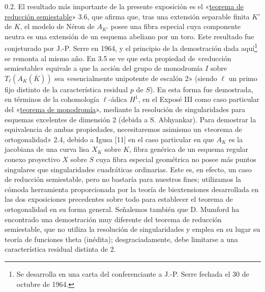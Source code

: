 0.2. El resultado más importante de la presente exposición es el
«\underline{teorema de reducción semiestable}» 3.6, que afirma que,
tras una extensión separable finita $K'$ de $K$, el modelo de Néron de
$A_{K'}$ posee una fibra especial cuya componente neutra es una
extensión de un esquema abeliano por un toro. Este resultado fue
conjeturado por J.-P. Serre en 1964, y el principio de la demostración
dada aquí\footnote{Se desarrolla en una carta del conferenciante a
J.-P. Serre fechada el 30 de octubre de 1964.} se remonta al mismo año.
En 3.5 se ve que esta propiedad de «reducción semiestable» equivale a
que la acción del grupo de monodromía $I$ sobre
$T_\ell(A_K(\overline K))$ sea «esencialmente unipotente de escalón 2»
(siendo $\ell$ un primo fijo distinto de la característica residual
$p$ de $S$). En esta forma fue demostrada, en términos de la cohomología
$\ell$-ádica $H^1$, en el Exposé III como caso particular del
«\underline{teorema de monodromía}», mediante la resolución de
singularidades para esquemas excelentes de dimensión $2$ (debida a
S. Abhyankar). Para demostrar la equivalencia de ambas propiedades,
necesitaremos asimismo un «teorema de ortogonalidad» 2.4, debido a
Igusa [11] en el caso particular en que $A_K$ es la jacobiana de una
curva lisa $X_K$ sobre $K$, fibra genérica de un esquema regular conexo
proyectivo $X$ sobre $S$ cuya fibra especial geométrica no posee más
puntos singulares que singularidades cuadráticas ordinarias. Este es,
en efecto, un caso de reducción semiestable, pero no bastaría para
nuestros fines; utilizamos la cómoda herramienta proporcionada por la
teoría de biextensiones desarrollada en las dos exposiciones
precedentes sobre todo para establecer el teorema de ortogonalidad en
su forma general. Señalemos también que D. Mumford ha encontrado una
demostración muy diferente del teorema de reducción semiestable, que
no utiliza la resolución de singularidades y emplea en su lugar su
teoría de funciones theta (inédita); desgraciadamente, debe limitarse
a una característica residual distinta de $2$.

